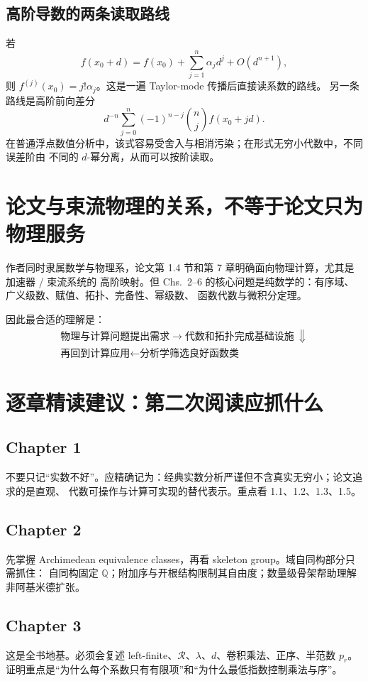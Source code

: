 \documentclass[11pt,a4paper]{article}
\theoremstyle{remark}
\newcommand{\LC}{\mathcal R}
\newcommand{\Q}{\mathbb Q}
\begin{document}
\subsection{高阶导数的两条读取路线}

若
\[
f(x_0+d)=f(x_0)+\sum_{j=1}^{n}\alpha_jd^j+O(d^{n+1}),
\]
则 $f^{(j)}(x_0)=j!\alpha_j$。这是一遍 Taylor-mode 传播后直接读系数的路线。
另一条路线是高阶前向差分
\[
d^{-n}\sum_{j=0}^{n}(-1)^{n-j}\binom nj f(x_0+jd).
\]
在普通浮点数值分析中，该式容易受舍入与相消污染；在形式无穷小代数中，不同误差阶由
不同的 $d$-幂分离，从而可以按阶读取。

\section{论文与束流物理的关系，不等于论文只为物理服务}

作者同时隶属数学与物理系，论文第 1.4 节和第 7 章明确面向物理计算，尤其是加速器 / 束流系统的
高阶映射。但 Chs.~2--6 的核心问题是纯数学的：有序域、广义级数、赋值、拓扑、完备性、幂级数、
函数代数与微积分定理。

因此最合适的理解是：
\[
\begin{gathered}
\text{物理与计算问题提出需求}
\longrightarrow
\text{代数和拓扑完成基础设施}\
\Downarrow\\[-0.2em]
\text{再回到计算应用}
\longleftarrow
\text{分析学筛选良好函数类}
\end{gathered}
\]

\section{逐章精读建议：第二次阅读应抓什么}

\subsection*{Chapter 1}
不要只记“实数不好”。应精确记为：经典实数分析严谨但不含真实无穷小；论文追求的是直观、
代数可操作与计算可实现的替代表示。重点看 1.1、1.2、1.3、1.5。

\subsection*{Chapter 2}
先掌握 Archimedean equivalence classes，再看 skeleton group。域自同构部分只需抓住：
自同构固定 $\Q$；附加序与开根结构限制其自由度；数量级骨架帮助理解非阿基米德扩张。

\subsection*{Chapter 3}
这是全书地基。必须会复述 left-finite、$\LC$、$\lambda$、$d$、卷积乘法、正序、半范数 $p_r$。
证明重点是“为什么每个系数只有有限项”和“为什么最低指数控制乘法与序”。
\end{document}
